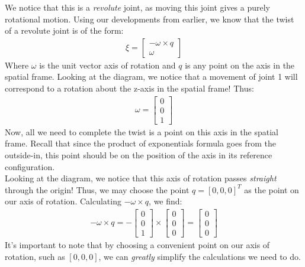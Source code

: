 \documentclass[oneside]{book}
\begin{document}
We notice that this is a \textit{revolute} joint, as moving this joint gives a purely rotational motion. Using our developments from earlier, we know that the twist of a revolute joint is of the form:
\begin{align}
    \xi = 
    \begin{bmatrix}
        -\omega \times q\\
        \omega
    \end{bmatrix}
\end{align}
Where $\omega$ is the unit vector axis of rotation and $q$ is any point on the axis in the spatial frame. Looking at the diagram, we notice that a movement of joint 1 will correspond to a rotation about the z-axis in the spatial frame! Thus:
\begin{align}
    \omega = \begin{bmatrix}
        0\\
        0\\
        1
    \end{bmatrix}
\end{align}
Now, all we need to complete the twist is a point on this axis in the spatial frame. Recall that since the product of exponentials formula goes from the outside-in, this point should be on the position of the axis in its reference configuration.\\
Looking at the diagram, we notice that this axis of rotation passes \textit{straight} through the origin! Thus, we may choose the point $q = [0, 0, 0]^T$ as the point on our axis of rotation. Calculating $-\omega \times q$, we find:
\begin{align}
    -\omega \times q = 
    -\begin{bmatrix}
        0\\
        0\\
        1
    \end{bmatrix}
    \times 
    \begin{bmatrix}
        0\\
        0\\
        0
    \end{bmatrix}
     = 
     \begin{bmatrix}
        0\\
        0\\
        0
    \end{bmatrix}
\end{align}
It's important to note that by choosing a convenient point on our axis of rotation, such as $[0, 0, 0]$, we can \textit{greatly} simplify the calculations we need to do.\\
\end{document}
